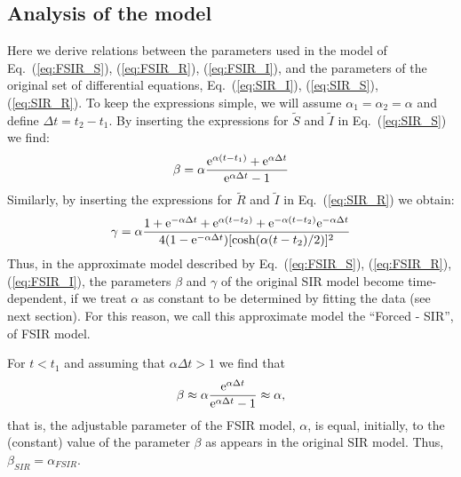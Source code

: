 \documentclass[aps,preprint]{revtex4}
\newcommand{\eexp}{{\rm e}}
\newcommand{\Stild}{\tilde{S}}
\newcommand{\Rtild}{{\tilde R}}
\newcommand{\Itild}{{\tilde I}}
\begin{document}
\subsection{Analysis of the model}

Here we derive relations between the parameters used in the model of 
Eq.~(\ref{eq:FSIR_S}), (\ref{eq:FSIR_R}), (\ref{eq:FSIR_I}), and the parameters of the original set of differential 
equations, Eq.~(\ref{eq:SIR_I}), (\ref{eq:SIR_S}), (\ref{eq:SIR_R}). 
To keep the expressions simple, we will assume $\alpha_1=\alpha_2=\alpha$ and 
define $\Delta t = t_2 - t_1$. By inserting the expressions for $\Stild$ and $\Itild$ 
in Eq.~(\ref{eq:SIR_S}) we find: 
\begin{equation}
\beta = \alpha  \frac{\eexp^{\alpha(t-t_1)} + \eexp^{\alpha \Delta t}}
{\eexp^{\alpha \Delta t} - 1}
\label{eq:beta}
\end{equation}
Similarly, by inserting the expressions for $\Rtild$ and $\Itild$ in Eq.~(\ref{eq:SIR_R}) we obtain:
\begin{equation}
\gamma = \alpha 
\frac{1+ \eexp^{-\alpha \Delta t} +  \eexp^{\alpha(t-t_2)} +  \eexp^{-\alpha(t-t_2)} \eexp^{-\alpha \Delta t}  }
{4 (1-  \eexp^{-\alpha \Delta t} ) [\cosh(\alpha(t-t_2)/2)]^2}
\label{eq:gamma}
\end{equation}
Thus, in the approximate model described by Eq.~(\ref{eq:FSIR_S}), (\ref{eq:FSIR_R}), (\ref{eq:FSIR_I}), 
the parameters $\beta$ and $\gamma$ of the original SIR model become time-dependent, 
if we treat $\alpha$ as constant to be determined by fitting the data (see next section). 
For this reason, we call this approximate model the ``Forced - SIR'', of FSIR model. 

For $t< t_1$ and assuming that $\alpha \Delta t > 1$ we find that 
$$\beta \approx  \alpha \frac{\eexp^{\alpha \Delta t}}
{\eexp^{\alpha \Delta t} - 1} \approx \alpha,$$
that is, the adjustable parameter of the FSIR model, $\alpha$, is equal, initially, to the (constant) value of the parameter $\beta$ as appears in the original SIR model. Thus, $\beta_{SIR} = \alpha_{FSIR}$.
\end{document}
